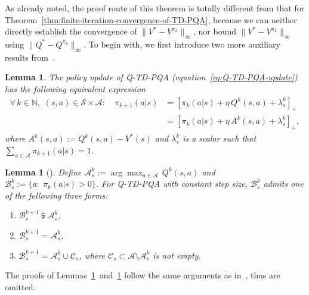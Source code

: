 \documentclass[10pt]{article}
\newcommand{\calA}{\mathcal{A}}
\newcommand{\calB}{\mathcal{B}}
\newcommand{\calS}{\mathcal{S}}
\newcommand{\ls}{\left}
\newcommand{\rs}{\right}
\theoremstyle{plain}
\newtheorem{lemma}[theorem]{Lemma}
\theoremstyle{definition}
\begin{document}
    As already noted, the proof route of this theorem is totally different from that for Theorem~\ref{thm:finite-iteration-convergence-of-TD-PQA}, because we can neither directly establish the convergence of $\| V^* - V^{\pi_k} \|_\infty$, nor bound $\| V^* - V^{\pi_k} \|_\infty$ using $\| Q^* - Q^{\pi_k} \|_\infty$. To begin with, we first introduce two more auxiliary results from~\cite{ppgliu}.

    \begin{lemma}
        The policy update of Q-TD-PQA (equation~\eqref{eq:Q-TD-PQA-update}) has the following equivalent expression
        \begin{align*}
            \forall\, k\in\mathbb{N}, \,\, (s,a) \in \calS\times\calA:\quad \pi_{k+1}(a|s) &= \ls[ \pi_k(a|s) + \eta \, Q^k(s,a) + \lambda_s^k \rs]_+ \\
            &= \ls[ \pi_k(a|s) + \eta \, A^k(s,a) + \lambda_s^k \rs]_+,
        \end{align*}
        where $A^k(s,a) := Q^k(s,a) - V^*(s)$ and $\lambda_s^k$ is a scalar such that $\sum_{a\in\calA} \pi_{k+1}(a|s) = 1$.
        \label{pro:Q-TD-PQA-update}
    \end{lemma}
    
    \begin{lemma}[]
        Define $\calA^k_s := \arg\max_{a\in\calA} \, Q^k(s,a)$ and $\calB^k_s := \{ a: \; \pi_k(a|s) > 0 \}$. For Q-TD-PQA with constant step size, $\calB^k_s$ admits one of the following three forms:
        \begin{enumerate}
            \item $\calB^{k+1}_s \subsetneqq \calA^k_s$,
            \item $\calB^{k+1}_s = \calA^k_s$,
            \item $\calB^{k+1}_s = \calA^k_s \cup \mathcal{C}_s$, where $\mathcal{C}_s \subset \calA \setminus \calA^k_s$ is not empty.
        \end{enumerate}
        \label{lem:proj-support}
    \end{lemma}
    The proofs of Lemmas~\ref{pro:Q-TD-PQA-update}~and~\ref{lem:proj-support} follow the same arguments as in~\cite{ppgliu}, thus are omitted. 
\end{document}
